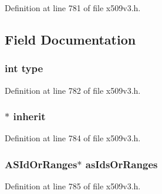 Definition at line 781 of file x509v3.\+h.



\subsection{Field Documentation}
\subsubsection[{\texorpdfstring{type}{type}}]{\setlength{\rightskip}{0pt plus 5cm}int type}\hypertarget{struct_a_s_identifier_choice__st_ac765329451135abec74c45e1897abf26}{}\label{struct_a_s_identifier_choice__st_ac765329451135abec74c45e1897abf26}


Definition at line 782 of file x509v3.\+h.

\subsubsection[{\texorpdfstring{inherit}{inherit}}]{$\ast$ inherit}\hypertarget{struct_a_s_identifier_choice__st_aec983f5c76248f78211a9212bdd26548}{}\label{struct_a_s_identifier_choice__st_aec983f5c76248f78211a9212bdd26548}


Definition at line 784 of file x509v3.\+h.

\subsubsection[{\texorpdfstring{as\+Ids\+Or\+Ranges}{asIdsOrRanges}}]{\setlength{\rightskip}{0pt plus 5cm}A\+S\+Id\+Or\+Ranges$\ast$ as\+Ids\+Or\+Ranges}\hypertarget{struct_a_s_identifier_choice__st_a00d3c090b8bb3fba5f96ead3056f3cb2}{}\label{struct_a_s_identifier_choice__st_a00d3c090b8bb3fba5f96ead3056f3cb2}


Definition at line 785 of file x509v3.\+h.

